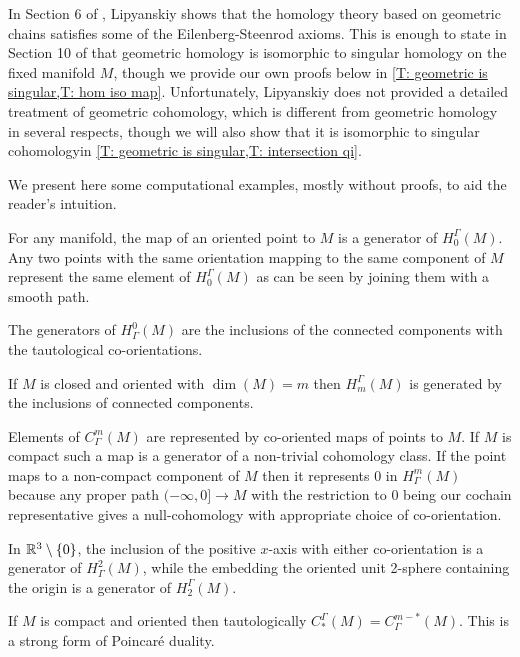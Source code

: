 \begin{comment}
	In Section 6 of \cite{Lipy14}, Lipyanskiy shows that the homology of $C_\Gamma^*(M)$, which we denote by $H_\Gamma^*(M)$,
	agrees with singular cohomology
	through the verification of homotopy and excision axioms.
	We find Mayer-Vietoris better for our applications, and we review both its verification
	and that of homotopy invariance as we need details about such constructions in our work.
\end{comment}

In Section 6 of \cite{Lipy14}, Lipyanskiy shows that the homology theory based on geometric chains satisfies some of the Eilenberg-Steenrod axioms.
This is enough to state in Section 10 of \cite{Lipy14} that geometric homology is isomorphic to singular homology on the fixed manifold $M$, though we provide our own proofs below in \cref{T: geometric is singular,T: hom iso map}.
Unfortunately, Lipyanskiy does not provided a detailed treatment of geometric cohomology, which is different from geometric homology in several respects, though we will also show that it is isomorphic to singular cohomologyin \cref{T: geometric is singular,T: intersection qi}.

We present here some computational examples, mostly without proofs, to aid the reader's intuition.

\begin{example}\label{E: first examples}
	For any manifold, the map of an oriented point to $M$ is a generator of $H_0^\Gamma(M)$.
	Any two points with the same orientation mapping to the same component of $M$ represent the same element of $H_0^\Gamma(M)$ as can be seen by joining them with a smooth path.

	The generators of $H^0_\Gamma(M)$ are the inclusions of the connected components with the tautological co-orientations.

	If $M$ is closed and oriented with $\dim(M) = m$ then $H_m^\Gamma(M)$ is generated by the inclusions of connected components.

	Elements of $C_\Gamma^m(M)$ are represented by co-oriented maps of points to $M$.
	If $M$ is compact such a map is a generator of a non-trivial cohomology class.
	If the point maps to a non-compact component of $M$ then it represents $0$ in $H_\Gamma^m(M)$ because any proper path $(-\infty,0] \to M$ with the restriction to $0$ being our cochain representative gives a null-cohomology with appropriate choice of co-orientation.

	In $\mathbb{R}^3 \setminus \{0\}$, the inclusion of the positive $x$-axis with either co-orientation is a generator of $H_\Gamma^2(M)$, while the embedding the oriented unit 2-sphere containing the origin is a generator of $H_2^\Gamma(M)$.

	If $M$ is compact and oriented then tautologically $C_*^\Gamma(M) = C_\Gamma^{m-*}(M)$.
	This is a strong form of Poincar\'e duality.
\end{example}

